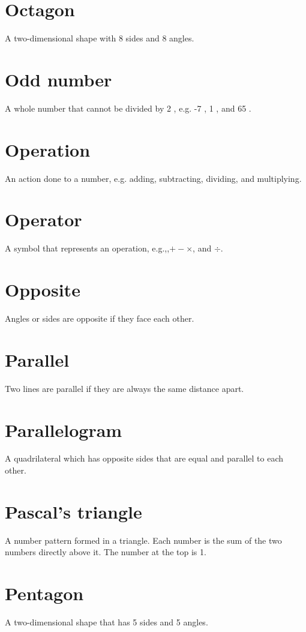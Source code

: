 \documentclass[10pt]{article}
\begin{document}
\section*{Octagon}
A two-dimensional shape with 8 sides and 8 angles.

\section*{Odd number}
A whole number that cannot be divided by 2 , e.g. -7 , 1 , and 65 .

\section*{Operation}
An action done to a number, e.g. adding, subtracting, dividing, and multiplying.

\section*{Operator}
A symbol that represents an operation, e.g.,,$+- \times$, and $\div$.

\section*{Opposite}
Angles or sides are opposite if they face each other.

\section*{Parallel}
Two lines are parallel if they are always the same distance apart.

\section*{Parallelogram}
A quadrilateral which has opposite sides that are equal and parallel to each other.

\section*{Pascal's triangle}
A number pattern formed in a triangle. Each number is the sum of the two numbers directly above it. The number at the top is 1.

\section*{Pentagon}
A two-dimensional shape that has 5 sides and 5 angles.
\end{document}
